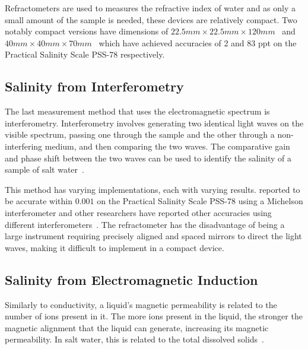 Refractometers are used to measures the refractive index of water and as only a small amount of the sample is needed, these devices are relatively compact.
Two notably compact versions have dimensions of $22.5mm \times 22.5mm \times 120mm$~\cite{malarde_compact_refractometer_2008} and $40mm \times 40mm \times 70mm$~\cite{tengesdal_compact_refractometer_2012} which have achieved accuracies of 2 and 83 \gls{ppt} on the Practical Salinity Scale PSS-78 respectively.

\subsection{Salinity from Interferometry}

The last measurement method that uses the electromagnetic spectrum is interferometry.
Interferometry involves generating two identical light waves on the visible spectrum, passing one through the sample and the other through a non-interfering medium, and then comparing the two waves.
The comparative gain and phase shift between the two waves can be used to identify the salinity of a sample of salt water~\cite{liao_interferometer_seawater_salinity_2023}.

This method has varying implementations, each with varying results.
 reported to be accurate within $0.001$ on the Practical Salinity Scale PSS-78 using a Michelson interferometer and other researchers have reported other accuracies using different interferometers~\cite{possetti_interferometer_salinity_measurement_2009, nguyen_interferometer_salinity_measurement_2009, zhao_interferometer_salinity_measurement_2009}.
The refractometer has the disadvantage of being a large instrument requiring precisely aligned and spaced mirrors to direct the light waves, making it difficult to implement in a compact device. 

\subsection{Salinity from Electromagnetic Induction}

Similarly to conductivity, a liquid's magnetic permeability is related to the number of ions present in it.
The more ions present in the liquid, the stronger the magnetic alignment that the liquid can generate, increasing its magnetic permeability.
In salt water, this is related to the total dissolved solids~\cite{somaraju_electromagnetic_salinity_2006}.

